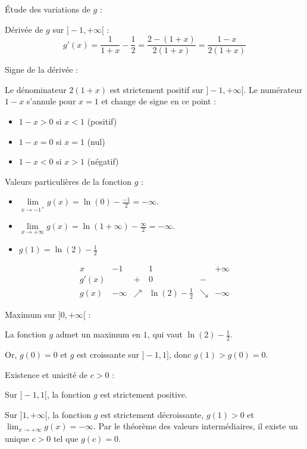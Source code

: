 \documentclass[10pt,a4paper]{article}
\begin{document}
\q Étude des variations de \( g \) :

Dérivée de \( g \) sur \( ]-1, +\infty[ \) :
\[
 g'(x) = \frac{1}{1+x} - \frac{1}{2} = \frac{2 - (1+x)}{2(1+x)} = \frac{1 - x}{2(1+x)}
\]

Signe de la dérivée :

Le dénominateur \( 2(1+x) \) est strictement positif sur \( ]-1, +\infty[ \).
Le numérateur \( 1-x \) s'annule pour \( x = 1 \) et change de signe en ce point :
\begin{itemize}
    \item \( 1-x > 0 \) si \( x < 1 \) (positif)
    \item \( 1-x = 0 \) si \( x = 1 \) (nul)
    \item \( 1-x < 0 \) si \( x > 1 \) (négatif)
\end{itemize}

Valeurs particulières de la fonction \( g \) :
\begin{itemize}
    \item \( \lim\limits_{x \to -1^+} g(x) = \ln(0) - \frac{-1}{2} = -\infty \).
    \item \( \lim\limits_{x \to +\infty} g(x) = \ln(1+\infty) - \frac{\infty}{2} = -\infty \).
    \item \( g(1) = \ln(2) - \frac{1}{2} \)
\end{itemize}

\[
\begin{array}{c|ccccc}
x & -1 &  & 1 &  & +\infty \\
\hline
g'(x) &  & + & 0 & - &  \\
\hline
g(x) & -\infty & \nearrow & \ln(2) - \frac{1}{2} & \searrow & -\infty
\end{array}
\]


\q Maximum sur \( ]0, +\infty[ \) :

La fonction \( g \) admet un maximum en \( 1 \), qui vaut \( \ln(2) - \frac{1}{2} \).

Or, \( g(0) = 0 \) et \( g \) est croissante sur \( ]-1, 1] \), donc \( g(1) > g(0) = 0 \).


\q Existence et unicité de \( c > 0 \) :

Sur  \( ]-1, 1[ \), la fonction \( g \) est strictement positive.

Sur  \( ]1, +\infty[ \), la fonction \( g \) est strictement décroissante, \( g(1) > 0 \) et \(
\lim_{x \to +\infty} g(x) = -\infty \). Par le théorème des valeurs intermédiaires, il existe un
unique \( c > 0 \) tel que \( g(c) = 0 \).
\end{document}
